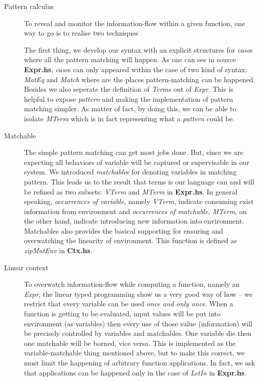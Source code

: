 \documentclass[a4paper]{article}
\begin{document}
\begin{description}
\item[Pattern calculus] {
    To reveal and monitor the information-flow within a given function, one way to go is to realise two techniques
    The first thing, we develop our syntax with an explicit structures for \textit{case}s where all the pattern matching will happen. As one can see in source \textbf{Expr.hs}, \textit{case}s can only appeared within the case of two kind of syntax: \textit{MatEq} and \textit{Match} where are the places pattern-matching can be happened. Besides we also seperate the definition of \textit{Terms} out of  \textit{Expr}. This is helpful to expose \textit{pattern} and making the implementation of pattern matching simpler. As matter of fact, by doing this, we can be able to isolate \textit{MTerm} which is in fact representing what a \textit{pattern} could be.
}
\item[Matchable] {
    The simple pattern matching can get most jobs done. But, since we are expecting all behaviors of variable will be captured or supervisable in our system. We introduced \textit{matchable}s for denoting variables in matching pattern. This leads us to the result that terms is our language can and will be refined as two subsets: \textit{VTerm} and \textit{MTerm} in \textbf{Expr.hs}. In general speaking, \textit{occurrences of variable}, namely \textit{VTerm}, indicate consuming exist information from environment and \textit{occurrences of matchable}, \textit{MTerm}, on the other hand, indicate introducing new information into environment. Matchables also provides the basical supporting for ensuring and overwatching the linearity of environment. This function is defined as  \textit{zipMatEnv} in \textbf{Ctx.hs}.
}
\item[Linear context] {
    To overwatch information-flow while computing a function, namely an \textit{Expr}, the linear typed programming show us a very good way of how -- we restrict that every variable can be used \emph{once and only once}. When a function is getting to be evaluated, input values will be put into environment (as variables) then every use of those value (information) will be precisely controlled by variables and matchables. One variable die then one matchable will be borned, vice versa. This is implemented as the variable-matchable thing mentioned above, but to make this correct, we must limit the happening of arbitrary function applications. In fact, we ask that applications can be happened only in the case of \textit{LetIn} in \textbf{Expr.hs}.
}
\end{description}
\end{document}
